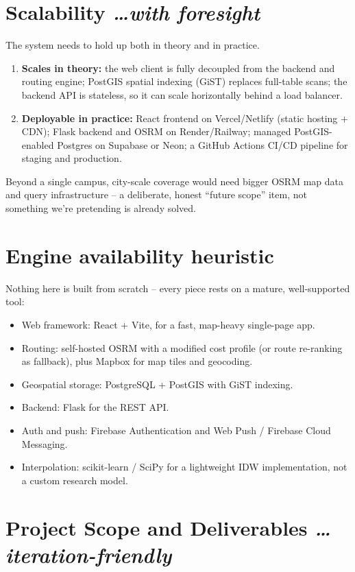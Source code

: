 \documentclass[11pt,a4paper]{article}
\newcommand{\BvrHint}[1]{%
  {\normalfont\normalsize\itshape\hfill #1}}
\begin{document}
\section{Scalability %
\BvrHint{\ldots with foresight}}
The system needs to hold up both in theory and in practice.
\begin{enumerate}[leftmargin=0.7cm]
    \item \textbf{Scales in theory:} the web client is fully
    decoupled from the backend and routing engine; PostGIS spatial
    indexing (GiST) replaces full-table scans; the backend API is
    stateless, so it can scale horizontally behind a load balancer.
    \item \textbf{Deployable in practice:} React frontend on
    Vercel/Netlify (static hosting + CDN); Flask backend and OSRM
    on Render/Railway; managed PostGIS-enabled Postgres on
    Supabase or Neon; a GitHub Actions CI/CD pipeline for staging
    and production.
\end{enumerate}
Beyond a single campus, city-scale coverage would need bigger OSRM
map data and query infrastructure -- a deliberate, honest
``future scope'' item, not something we're pretending is already
solved.

\section{Engine availability heuristic}
Nothing here is built from scratch -- every piece rests on a
mature, well-supported tool:
\begin{itemize}[leftmargin=0.7cm]
    \item Web framework: React + Vite, for a fast, map-heavy
    single-page app.
    \item Routing: self-hosted OSRM with a modified cost profile
    (or route re-ranking as fallback), plus Mapbox for map tiles
    and geocoding.
    \item Geospatial storage: PostgreSQL + PostGIS with GiST
    indexing.
    \item Backend: Flask for the REST API.
    \item Auth and push: Firebase Authentication and Web Push /
    Firebase Cloud Messaging.
    \item Interpolation: scikit-learn / SciPy for a lightweight
    IDW implementation, not a custom research model.
\end{itemize}

\section{Project Scope and Deliverables %
\BvrHint{\ldots iteration-friendly}}
\end{document}

